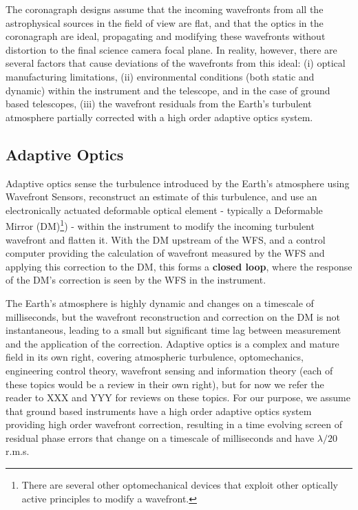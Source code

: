 \documentclass[letterpaper]{ar-1col}
\begin{document}
The coronagraph designs assume that the incoming wavefronts from all the astrophysical sources in the field of view are flat, and that the optics in the coronagraph are ideal, propagating and modifying these wavefronts without distortion to the final science camera focal plane.
%
In reality, however, there are several factors that cause deviations of the wavefronts from this ideal: (i) optical manufacturing limitations, (ii) environmental conditions (both static and dynamic) within the instrument and the telescope, and in the case of ground based telescopes, (iii) the wavefront residuals from the Earth's turbulent atmosphere partially corrected with a high order adaptive optics system.

\begin{armarginnote}[]
\end{armarginnote}

\subsection{Adaptive Optics}

Adaptive optics sense the turbulence introduced by the Earth's atmosphere using Wavefront Sensors, reconstruct an estimate of this turbulence, and use an electronically actuated deformable optical element - typically a Deformable Mirror (DM)\footnote{There are several other optomechanical devices that exploit other optically active principles to modify a wavefront.}) - within the instrument to modify the incoming turbulent wavefront and flatten it.
%
With the DM upstream of the WFS, and a control computer providing the calculation of wavefront measured by the WFS and applying this correction to the DM, this forms a {\bf closed loop}, where the response of the DM's correction is seen by the WFS in the instrument.

The Earth's atmosphere is highly dynamic and changes on a timescale of milliseconds, but the wavefront reconstruction and correction on the DM is not instantaneous, leading to a small but significant time lag between measurement and the application of the correction.
%
Adaptive optics is a complex and mature field in its own right, covering atmospheric turbulence, optomechanics, engineering control theory, wavefront sensing and information theory (each of these topics would be a review in their own right), but for now we refer the reader to XXX and YYY for reviews on these topics. 
%
For our purpose, we assume that ground based instruments have a high order adaptive optics system providing high order wavefront correction, resulting in a time evolving screen of residual phase errors that change on a timescale of milliseconds and have $\lambda/20$ r.m.s.
\end{document}
